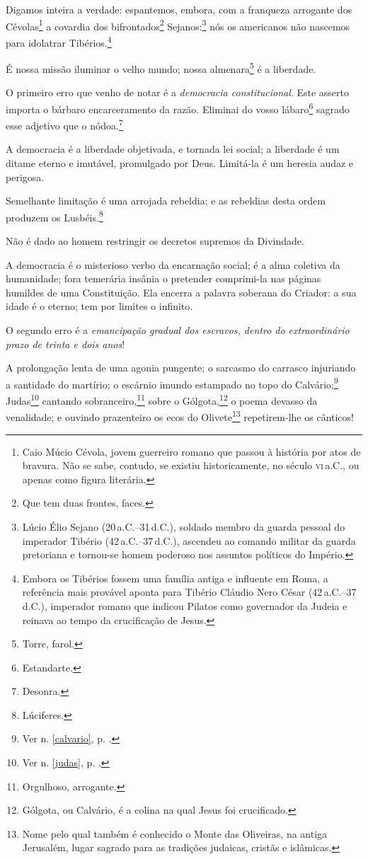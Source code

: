 Digamos inteira a verdade: espantemos, embora, com a franqueza arrogante
dos Cévolas\footnote{Caio Múcio Cévola, jovem guerreiro romano que
  passou à história por atos de bravura. Não se sabe, contudo, se
  existiu historicamente, no século \textsc{vi}\,a.C., ou apenas
  como figura literária.} a covardia dos bifrontados\footnote{Que tem
  duas frontes, faces.} Sejanos:\footnote{Lúcio Élio Sejano (20\,a.C.--31\,d.C.), 
  soldado membro da guarda pessoal do imperador Tibério (42\,a.C.--37\,d.C.), 
  ascendeu ao comando militar da guarda pretoriana e tornou-se
  homem poderoso nos assuntos políticos do Império.} nós os americanos
não nascemos para idolatrar Tibérios.\footnote{Embora os Tibérios
  fossem uma família antiga e influente em Roma, a referência mais
  provável aponta para Tibério Cláudio Nero César (42\,a.C.--37\,d.C.),
  imperador romano que indicou Pilatos como governador da Judeia e
  reinava ao tempo da crucificação de Jesus.}

É nossa missão iluminar o velho mundo; nossa almenara\footnote{Torre,
  farol.} é a liberdade.

O primeiro erro que venho de notar é a \emph{democracia constitucional}.
Este asserto importa o bárbaro encarceramento da razão. Eliminai do
vosso lábaro\footnote{Estandarte.} sagrado esse adjetivo que o
nódoa.\footnote{Desonra.}

A democracia é a liberdade objetivada, e tornada lei social; a liberdade
é um ditame eterno e imutável, promulgado por Deus. Limitá-la é um
heresia audaz e perigosa.

Semelhante limitação é uma arrojada rebeldia; e as rebeldias desta ordem
produzem os Lusbéis.\footnote{Lúciferes.}

Não é dado ao homem restringir os decretos supremos da Divindade.

A democracia é o misterioso verbo da encarnação social; é a alma
coletiva da humanidade; fora temerária insânia o pretender comprimi-la
nas páginas humildes de uma Constituição. Ela encerra a palavra soberana
do Criador: a sua idade é o eterno; tem por limites o infinito.

O segundo erro é a \emph{emancipação gradual dos escravos, dentro do
extraordinário prazo de trinta e dois anos}!

A prolongação lenta de uma agonia pungente; o sarcasmo do carrasco
injuriando a santidade do martírio; o escárnio imundo estampado no topo
do Calvário;\footnote{Ver n. \ref{calvario}, p. \pageref{calvario}.} 
Judas\footnote{Ver n. \ref{judas}, p. \pageref{judas}.} 
  cantando sobranceiro,\footnote{Orgulhoso, arrogante.} sobre
o Gólgota,\footnote{Gólgota, ou Calvário, é a colina na qual Jesus foi
  crucificado.} o poema devasso da venalidade; e ouvindo prazenteiro os
ecos do Olivete\footnote{Nome pelo qual também é conhecido o Monte das
  Oliveiras, na antiga Jerusalém, lugar sagrado para as tradições
  judaicas, cristãs e islâmicas.} repetirem-lhe os cânticos!

